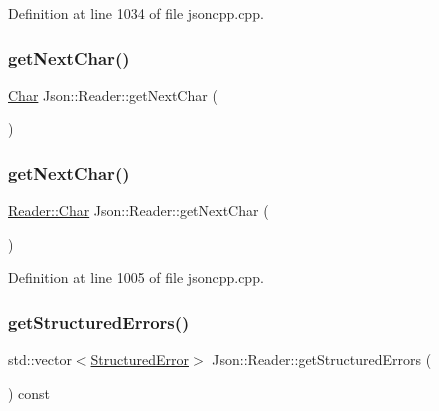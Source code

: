 Definition at line 1034 of file jsoncpp.\+cpp.

\hypertarget{class_json_1_1_reader_a2e310761d1ccef53e8b78b5d78d6659b}{}\label{class_json_1_1_reader_a2e310761d1ccef53e8b78b5d78d6659b} 
\subsubsection{\texorpdfstring{get\+Next\+Char()}{getNextChar()}\hspace{0.1cm}{\footnotesize\ttfamily [1/2]}}
{\footnotesize\ttfamily \hyperlink{class_json_1_1_reader_a3eec9118f3e9a672ba8348c3a79d0f45}{Char} Json\+::\+Reader\+::get\+Next\+Char (\begin{DoxyParamCaption}{ }\end{DoxyParamCaption})\hspace{0.3cm}{\ttfamily [private]}}

\hypertarget{class_json_1_1_reader_ab61eb61333cc9ec3afe785663a53ce90}{}\label{class_json_1_1_reader_ab61eb61333cc9ec3afe785663a53ce90} 
\subsubsection{\texorpdfstring{get\+Next\+Char()}{getNextChar()}\hspace{0.1cm}{\footnotesize\ttfamily [2/2]}}
{\footnotesize\ttfamily \hyperlink{class_json_1_1_reader_a3eec9118f3e9a672ba8348c3a79d0f45}{Reader\+::\+Char} Json\+::\+Reader\+::get\+Next\+Char (\begin{DoxyParamCaption}{ }\end{DoxyParamCaption})\hspace{0.3cm}{\ttfamily [private]}}



Definition at line 1005 of file jsoncpp.\+cpp.

\hypertarget{class_json_1_1_reader_afa5aa28e5345b4a90c411a206b1d63b1}{}\label{class_json_1_1_reader_afa5aa28e5345b4a90c411a206b1d63b1} 
\subsubsection{\texorpdfstring{get\+Structured\+Errors()}{getStructuredErrors()}\hspace{0.1cm}{\footnotesize\ttfamily [1/2]}}
{\footnotesize\ttfamily std\+::vector$<$\hyperlink{struct_json_1_1_reader_1_1_structured_error}{Structured\+Error}$>$ Json\+::\+Reader\+::get\+Structured\+Errors (\begin{DoxyParamCaption}{ }\end{DoxyParamCaption}) const}



